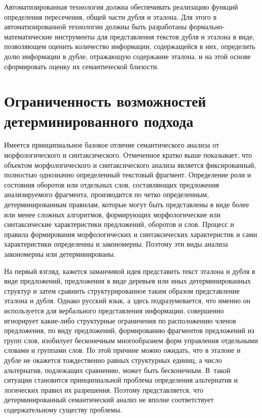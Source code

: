 \begin{multicols}{2}
   Автоматизированная технология должна обеспечивать реализацию 
функций определения пересечения, общей части дубля и эталона. Для этого в 
автоматизированной технологии должны быть разработаны формально-математические 
инструменты для представления текстов дубля и эталона в 
виде, позволяющем оценить количество информации, содержащейся в них, 
определить долю информации в дубле, отражающую содержание эталона, и 
на этой основе сформировать оценку их семантической близости. 
   
\section{Ограниченность возможностей детерминированного 
подхода}
   
   Имеется принципиальное базовое отличие семантического анализа от 
морфологического и синтак\-си\-че\-ско\-го. Отмеченное кратко выше показывает, 
что объектом морфологического и синтаксического анализа является 
фиксированный, \mbox{полностью} однозначно определенный текстовый фрагмент. 
Определение роли и состояния оборотов или отдельных слов, составляющих 
предложения анализируемого фрагмента, производится по четко 
определенным, детерминированным правилам, которые могут быть 
представлены в виде более или менее сложных алгоритмов, формирующих 
морфологические или синтаксические характеристики предложений, 
оборотов и слов. Процесс и правила формирования морфологических и 
синтаксических характеристик и сами характеристики определенны и 
закономерны. Поэтому эти виды анализа закономерны или 
детерминированы.
   
   На первый взгляд, кажется заманчивой идея представить текст эталона и 
дубля в виде предложений, предложения в виде деревьев или иных 
детерминированных структур и затем сравнить структурированное таким 
образом представление эталона и дубля. Однако русский язык, а здесь 
подразумевается, что именно он используется для вербального 
представления информации, совершенно игнорирует какие-либо 
структурные ограничения по расположению членов предложения, по виду 
предложений, формированию фрагментов предложений из групп слов, 
изобилует бесконечным многообразием форм управления отдельными 
словами и группами слов. По этой причине можно ожидать, что в эталоне и 
дубле не окажется тождественно равных структурных единиц, а чис\-ло 
альтернатив, подлежащих сравнению, может быть бесконечным. В~такой 
ситуации становится принципиальной проблема определения альтернатив и 
логических правил их разрешения. Поэтому представляется, что 
детерминированный семантический анализ не вполне соответствует 
содержательному существу проб\-лемы.
   

\end{multicols}
